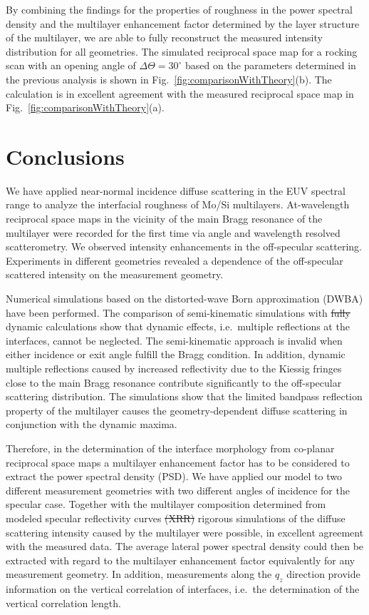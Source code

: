 \documentclass[twocolumn,osajnl,showpacs,superscriptaddress,11pt]{revtex4-1}
\providecommand{\DIFdel}[1]{{\protect\color{red}\sout{#1}}}                      %
\providecommand{\DIFdelbegin}{} %
\providecommand{\DIFdelend}{} %
\begin{document}
By combining the findings for the properties of roughness in the power spectral density and the multilayer enhancement factor determined by the layer structure of the multilayer, we are able to fully reconstruct the measured intensity distribution for all geometries. The simulated reciprocal space map for a rocking scan with an opening angle of $\Delta\Theta = 30^\circ$ based on the parameters determined in the previous analysis is shown in Fig.~\ref{fig:comparisonWithTheory}(b). The calculation is in excellent agreement with the measured reciprocal space map in Fig.~\ref{fig:comparisonWithTheory}(a). 


\section{Conclusions} We have applied near-normal incidence diffuse scattering in the EUV spectral range to analyze the interfacial roughness of Mo/Si multilayers. At-wavelength reciprocal space maps in the vicinity of the main Bragg resonance of the multilayer were recorded for the first time via angle and wavelength resolved scatterometry. We observed intensity enhancements in the off-specular scattering. Experiments in different geometries revealed a dependence of the off-specular scattered intensity on the measurement geometry.

Numerical simulations based on the distorted-wave Born approximation (DWBA) have been performed. The comparison of semi-kinematic simulations with \DIFdelbegin \DIFdel{fully }\DIFdelend dynamic calculations show that dynamic effects, i.e.~multiple reflections at the interfaces, cannot be neglected. The semi-kinematic approach is invalid when either incidence or exit angle fulfill the Bragg condition. In addition, dynamic multiple reflections caused by increased reflectivity due to the Kiessig fringes close to the main Bragg resonance contribute significantly to the off-specular scattering distribution. The simulations show that the limited bandpass reflection property of the multilayer causes the geometry-dependent diffuse scattering in conjunction with the dynamic maxima.

Therefore, in the determination of the interface morphology from co-planar reciprocal space maps a multilayer enhancement factor has to be considered to extract the power spectral density (PSD). We have applied our model to two different measurement geometries with two different angles of incidence for the specular case. Together with the multilayer composition determined from modeled specular reflectivity curves \DIFdelbegin \DIFdel{(XRR) }\DIFdelend rigorous simulations of the diffuse scattering intensity caused by the multilayer were possible, in excellent agreement with the measured data. The average lateral power spectral density could then be extracted with regard to the multilayer enhancement factor equivalently for any measurement geometry. In addition, measurements along the $q_z$ direction provide information on the vertical correlation of interfaces, i.e.~the determination of the vertical correlation length. 
\end{document}

